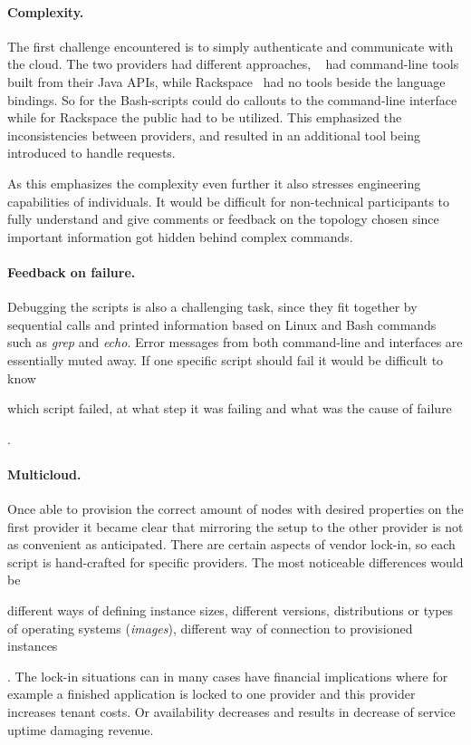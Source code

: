 \paragraph{Complexity.} 

The first challenge encountered is to simply 
authenticate and communicate with the cloud. 
The two providers had different approaches, ~\cite{aws} 
had command-line tools built from their Java APIs,
while Rackspace~\cite{rackspace} had no tools beside the  language bindings.
So for  the Bash-scripts could do callouts to the command-line interface 
while for Rackspace the public   had to be utilized.
This emphasized the inconsistencies between providers, 
and resulted in an additional tool being introduced to handle requests.

As this emphasizes the complexity even further it also stresses engineering 
capabilities of individuals.
It would be difficult for non-technical participants to fully understand and give comments
or feedback on the topology chosen since important information got hidden behind
complex commands.

\paragraph{Feedback on failure.}
Debugging the scripts is also a challenging task, since they fit together by
sequential calls and printed information based on Linux and Bash commands such as 
\emph{grep} and \emph{echo}.
Error messages from both command-line and  interfaces are essentially muted away.
If one specific script should fail it would be difficult to know 
\begin{ii}
  \iitem which script failed, 
  \iitem at what step it was failing and 
  \iitem what was the cause of failure
\end{ii}.

\paragraph{Multicloud.}

Once able to provision the correct amount of nodes with desired properties
on the first provider it became clear that mirroring the setup to the other provider 
is not as convenient as anticipated.
There are certain aspects of vendor lock-in, so each script is hand-crafted for specific providers.
The most noticeable differences would be
\begin{ii}
  \iitem different ways of defining instance sizes,
  \iitem different versions, distributions or types of operating systems (\emph{images}),
  \iitem different way of connection to provisioned instances
\end{ii}.
The lock-in situations can in many cases have financial implications where for example
a finished application is locked to one provider and this provider increases tenant costs.
Or availability decreases and results in decrease of service uptime damaging revenue.

